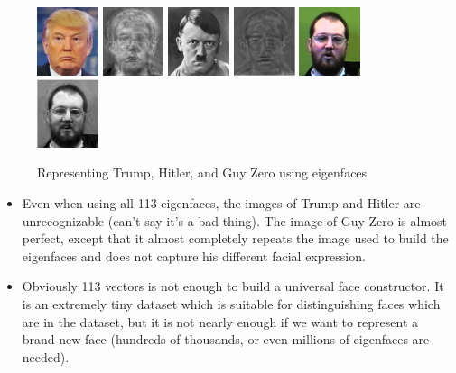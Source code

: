 \documentclass{article}
\begin{document}
\begin{enumerate}
\begin{figure}[h!]
\includegraphics[height=2cm]{../trump}
\includegraphics[height=2cm]{trump-recon}
\hspace{0.33cm}
\includegraphics[height=2cm]{../hitler}
\includegraphics[height=2cm]{hitler-recon}
\hspace{0.33cm}
\includegraphics[height=2cm]{../guy0}
\includegraphics[height=2cm]{guy0-recon}
\caption{Representing Trump, Hitler, and Guy Zero using eigenfaces}
\end{figure}

\begin{itemize}
\item
Even when using all 113 eigenfaces, the images of Trump and Hitler are unrecognizable (can't say it's a bad thing). The image of Guy Zero is almost perfect, except that it almost completely repeats the image used to build the eigenfaces and does not capture his different facial expression.

\item
Obviously 113 vectors is not enough to build a universal face constructor. It is an extremely tiny dataset which is suitable for distinguishing faces which are in the dataset, but it is not nearly enough if we want to represent a brand-new face (hundreds of thousands, or even millions of eigenfaces are needed).


\end{itemize}
\end{enumerate}
\end{document}
